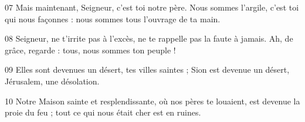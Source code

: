 
07 Mais maintenant, Seigneur, c’est toi notre père. Nous sommes l’argile, c’est toi qui nous façonnes : nous sommes tous l’ouvrage de ta main.

08 Seigneur, ne t’irrite pas à l’excès, ne te rappelle pas la faute à jamais. Ah, de grâce, regarde : tous, nous sommes ton peuple !

09 Elles sont devenues un désert, tes villes saintes ; Sion est devenue un désert, Jérusalem, une désolation.

10 Notre Maison sainte et resplendissante, où nos pères te louaient, est devenue la proie du feu ; tout ce qui nous était cher est en ruines.